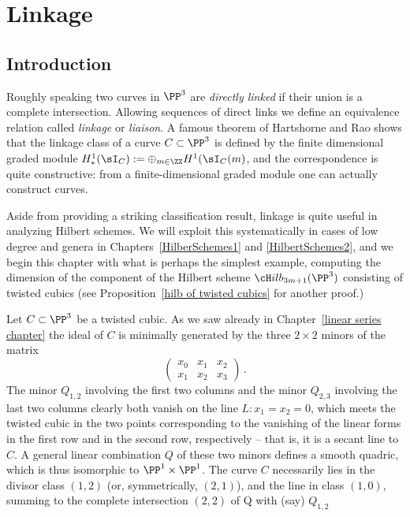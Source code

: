 

\chapter{Linkage}
\label{LiaisonChapter}\label{linkageChapter}


\section{Introduction} 

Roughly speaking two curves in $\PP^3$ are \emph{directly linked} if their union is a complete intersection.
Allowing sequences of direct links we define an equivalence relation called  \emph{linkage} or \emph{liaison}.
A famous theorem of Hartshorne and Rao shows that the linkage class of a curve $C\subset \PP^3$
is defined by the finite dimensional graded module $H^1_*(\sI_C) := \oplus_{m\in \ZZ}H^1(\sI_C(m)$,
and the correspondence is quite constructive: from a finite-dimensional graded module one can
actually construct curves.

Aside from providing a striking classification result, linkage is quite useful in analyzing Hilbert schemes. We will exploit this systematically in cases of low degree and genera in Chapters~\ref{HilberSchemes1} and \ref{HilbertSchemes2}, and we begin
this chapter with what is perhaps the simplest example, computing the dimension of the component of
the Hilbert scheme $\cH ilb_{3m+1}(\PP^3)$ consisting of twisted cubics (see Proposition~\ref{hilb of twisted cubics} for another proof.)

Let $C\subset \PP^3$ be a twisted cubic. As we saw already in Chapter~\ref{linear series chapter} the ideal of $C$
is minimally generated by the three $2\times 2$ minors of the matrix
$$
\begin{pmatrix}
 x_0&x_1&x_2\\
 x_1&x_2&x_3
\end{pmatrix}\,.
$$
The minor $Q_{1,2}$ involving the first two columns and the minor $Q_{2,3}$ involving the last two columns clearly
both vanish on the line $L: x_1 = x_2 = 0$, which meets the twisted cubic in the two points corresponding to the
vanishing of the linear forms in the first row and in the second row, respectively -- that is, it is a secant line to $C$. 
A general linear combination $Q$ of these two minors defines a smooth quadric, which is thus isomorphic to $\PP^1\times \PP^1$. The curve $C$ necessarily lies in the divisor class $(1,2)$ (or, symmetrically, $(2,1)$), and the line in class $(1,0)$, summing to the 
complete intersection $(2,2)$ of Q with (say) $Q_{1,2}$
 
